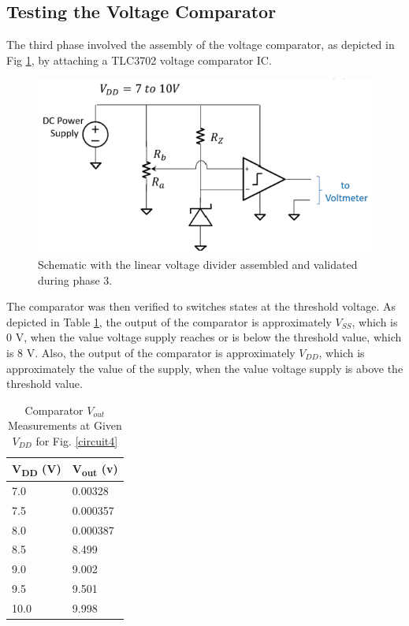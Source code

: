 \documentclass[conference]{IEEEtran}
\begin{document}
\subsection{Testing the Voltage Comparator}

The third phase involved the assembly of the voltage comparator, as depicted in Fig \ref{circuit3}, by attaching a TLC3702 voltage comparator IC.

\begin{figure}[htp]
\centerline{\includegraphics{./images/circuit3.png}}
\caption{Schematic with the linear voltage divider assembled and validated during phase 3. \cite{week7}}
\label{circuit3}
\end{figure}

The comparator was then verified to switches states at the threshold voltage. As depicted in Table \ref{tab2}, the output of the comparator is approximately $V_{SS}$, which is 0 V, when the value voltage supply reaches or is below the threshold value, which is 8 V. Also, the output of the comparator is approximately $V_{DD}$, which is approximately the value of the supply, when the value voltage supply is above the threshold value.

\begin{table}[htp]
\caption{Comparator $V_{out}$ Measurements at Given $V_{DD}$ for Fig. \ref{circuit4}}
\begin{center}
\begin{tabular}{|p{}|p{}|}
\hline
\textbf{V\textsubscript{DD} (V)}&\textbf{V\textsubscript{out} (v)} \\
\hline
7.0 & 0.00328 \\ \hline
7.5 & 0.000357 \\ \hline
8.0 & 0.000387 \\ \hline
8.5 & 8.499 \\ \hline
9.0 & 9.002 \\ \hline
9.5 & 9.501 \\ \hline
10.0 & 9.998 \\ \hline
\end{tabular}
\label{tab2}
\end{center}
\end{table}
\end{document}
